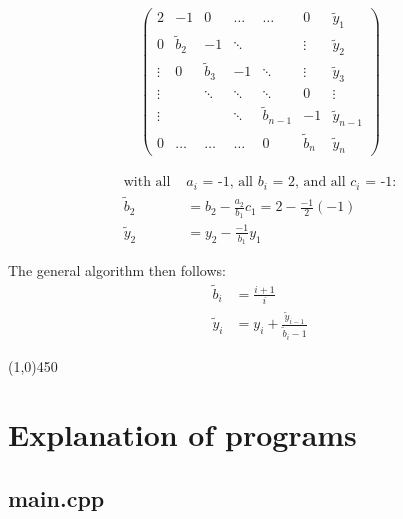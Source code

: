 \documentclass[11pt,a4paper,notitlepage]{article}
\begin{document}
\begin{minipage}{0.5\linewidth}
\begin{align*}
\left(\begin{matrix}
  2     & -1          & 0           & \dots   & \dots          & 0           &\tilde{y}_1    \\
  0     & \tilde{b}_2 & -1          & \ddots  &                & \vdots      &\tilde{y}_2    \\
 \vdots & 0           & \tilde{b}_3 & -1      & \ddots         & \vdots      &\tilde{y}_3    \\
 \vdots &             & \ddots      & \ddots  & \ddots         & 0           &\vdots         \\
 \vdots &             &             & \ddots  & \tilde{b}_{n-1}& -1       &\tilde{y}_{n-1}\\
  0     & \dots       & \dots       & \dots   & 0              & \tilde{b}_n &\tilde{y}_n
\end{matrix}\right)
\end{align*}
\end{minipage}
\begin{minipage}{0.5\linewidth}
	\begin{align*}
	\text{with all } &\text{$a_i$ = -1, all $b_i$ = 2, and all $c_i$ = -1:}\\
	\tilde{b}_2 &= b_2 - \frac{a_2}{b_1} c_1  = 2 - \frac{-1}{2} (-1)\\
	\tilde{y}_2 &= y_2 - \frac{-1}{b_1} y_1
	\end{align*}
\end{minipage}

The general algorithm then follows:
\begin{align*}
	\tilde{b}_i &= \frac{i+1}{i}\\
	\tilde{y}_i &= y_i + \frac{\tilde{y}_{i-1}}{\tilde{b}{_i-1}}
\end{align*}

\begin{center}
\line(1,0){450}
\end{center}

\section{Explanation of programs}
\subsection{main.cpp}
\end{document}
